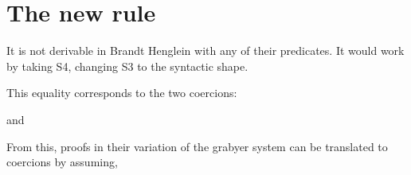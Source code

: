 
\section{The new rule}
It is not derivable in Brandt Henglein with any of their predicates. It would work by taking S4, changing S3 to the syntactic shape.


 This equality corresponds to the two coercions: 

and 

From this, proofs in their variation of the grabyer system can be translated to coercions by assuming, 


